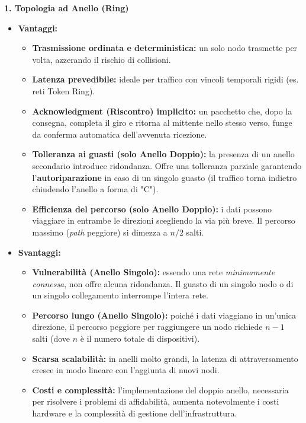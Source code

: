 \documentclass[a4paper,12pt]{report}
\begin{document}
\bigskip

\textbf{1. Topologia ad Anello (Ring)}
\begin{itemize}[leftmargin=*]
  \item \textbf{Vantaggi:}
  \begin{itemize}
    \item \textbf{Trasmissione ordinata e deterministica:} un solo nodo trasmette per volta, azzerando il rischio di collisioni.
    \item \textbf{Latenza prevedibile:} ideale per traffico con vincoli temporali rigidi (es. reti Token Ring).
    \item \textbf{Acknowledgment (Riscontro) implicito:} un pacchetto che, dopo la consegna, completa il giro e ritorna al mittente nello stesso verso, funge da conferma automatica dell'avvenuta ricezione.
    \item \textbf{Tolleranza ai guasti (solo Anello Doppio):} la presenza di un anello secondario introduce ridondanza. Offre una tolleranza parziale garantendo l'\textbf{autoriparazione} in caso di un singolo guasto (il traffico torna indietro chiudendo l'anello a forma di "C").
    \item \textbf{Efficienza del percorso (solo Anello Doppio):} i dati possono viaggiare in entrambe le direzioni scegliendo la via più breve. Il percorso massimo (\textit{path} peggiore) si dimezza a $n/2$ salti.
  \end{itemize}
  
  \item \textbf{Svantaggi:}
  \begin{itemize}
    \item \textbf{Vulnerabilità (Anello Singolo):} essendo una rete \textit{minimamente connessa}, non offre alcuna ridondanza. Il guasto di un singolo nodo o di un singolo collegamento interrompe l'intera rete.
    \item \textbf{Percorso lungo (Anello Singolo):} poiché i dati viaggiano in un'unica direzione, il percorso peggiore per raggiungere un nodo richiede $n-1$ salti (dove $n$ è il numero totale di dispositivi).
    \item \textbf{Scarsa scalabilità:} in anelli molto grandi, la latenza di attraversamento cresce in modo lineare con l'aggiunta di nuovi nodi.
    \item \textbf{Costi e complessità:} l'implementazione del doppio anello, necessaria per risolvere i problemi di affidabilità, aumenta notevolmente i costi hardware e la complessità di gestione dell'infrastruttura.
  \end{itemize}
\end{itemize}
\end{document}
